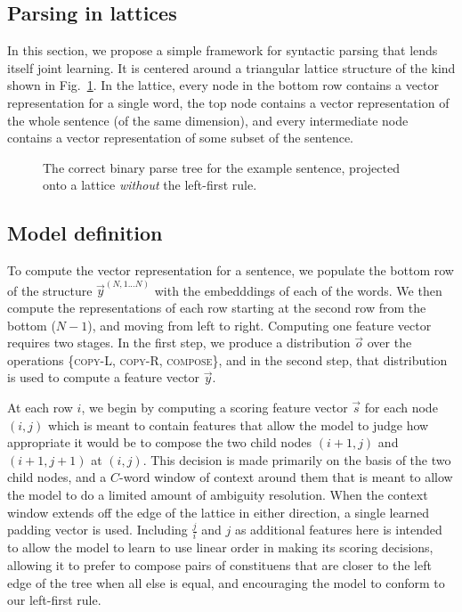\subsection{Parsing in lattices} 

In this section, we propose a simple framework for syntactic parsing that lends itself joint learning. It is centered around a triangular lattice structure of the kind shown in Fig.~\ref{lattice-fig1}. In the lattice, every node in the bottom row contains a vector representation for a single word, the top node contains a vector representation of the whole sentence (of the same dimension), and every intermediate node contains a vector representation of some subset of the sentence.

\begin{figure}[tp]
  \centering\small
 	

        \caption{The correct binary parse tree for the example sentence, projected onto a lattice \textit{without} the left-first rule.}
  \label{lattice-fig1}
\end{figure}



\subsection{Model definition}



To compute the vector representation for a sentence, we populate the bottom row of the structure $\vec{y}^{(N,1...N)}$ with the embedddings of each of the words. We then compute the representations of each row starting at the second row from the bottom ($N - 1$), and moving from left to right. Computing one feature vector requires two stages. In the first step, we produce a distribution $\vec{o}$ over the operations \{\textsc{copy-L, copy-R, compose}\}, and in the second step, that distribution is used to compute a feature vector $\vec{y}$.

At each row $i$, we begin by computing a scoring feature vector $\vec{s}$ for each node $(i, j)$ which is meant to contain features that allow the model to judge how appropriate it would be to compose the two child nodes $(i+1, j)$ and $(i+1, j+1)$ at $(i, j)$. This decision is made primarily on the basis of the two child nodes, and a $C$-word window of context around them that is meant to allow the model to do a limited amount of ambiguity resolution. When the context window extends off the edge of the lattice in either direction, a single learned padding vector is used. %
Including $\frac{j}{i}$ and $j$ as additional features here is intended to allow the model to learn to use linear order in making its scoring decisions, allowing it to prefer to compose pairs of constituens that are closer to the left edge of the tree when all else is equal, and encouraging the model to conform to our left-first rule.

